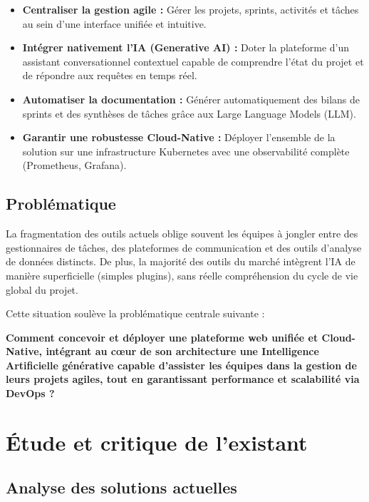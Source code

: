 \begin{itemize}
  \item \textbf{Centraliser la gestion agile :} Gérer les projets, sprints, activités et tâches au sein d'une interface unifiée et intuitive.
  \item \textbf{Intégrer nativement l'IA (Generative AI) :} Doter la plateforme d'un assistant conversationnel contextuel capable de comprendre l'état du projet et de répondre aux requêtes en temps réel.
  \item \textbf{Automatiser la documentation :} Générer automatiquement des bilans de sprints et des synthèses de tâches grâce aux Large Language Models (LLM).
  \item \textbf{Garantir une robustesse Cloud-Native :} Déployer l'ensemble de la solution sur une infrastructure Kubernetes avec une observabilité complète (Prometheus, Grafana).
\end{itemize}

\subsection{Problématique}

La fragmentation des outils actuels oblige souvent les équipes à jongler entre des gestionnaires 
de tâches, des plateformes de communication et des outils d'analyse de données distincts. 
De plus, la majorité des outils du marché intègrent l'IA de manière superficielle (simples plugins), 
sans réelle compréhension du cycle de vie global du projet.

Cette situation soulève la problématique centrale suivante :

\begin{notebox}
  \textbf{Comment concevoir et déployer une plateforme web unifiée et Cloud-Native, intégrant au cœur 
  de son architecture une Intelligence Artificielle générative capable d'assister les équipes 
  dans la gestion de leurs projets agiles, tout en garantissant performance et scalabilité via DevOps ?}
\end{notebox}


\section{Étude et critique de l'existant}
\label{sec:existant}

\subsection{Analyse des solutions actuelles}

